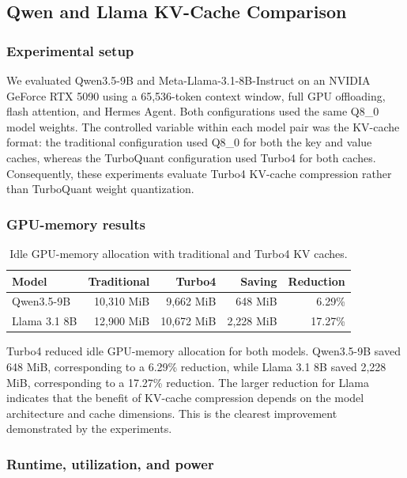 \subsection{Qwen and Llama KV-Cache Comparison}

\subsubsection{Experimental setup}

We evaluated Qwen3.5-9B and Meta-Llama-3.1-8B-Instruct on an
NVIDIA GeForce RTX 5090 using a 65,536-token context window, full GPU
offloading, flash attention, and Hermes Agent. Both configurations used the
same Q8\_0 model weights. The controlled variable within each model pair was
the KV-cache format: the traditional configuration used Q8\_0 for both the
key and value caches, whereas the TurboQuant configuration used Turbo4 for
both caches. Consequently, these experiments evaluate Turbo4 KV-cache
compression rather than TurboQuant weight quantization.

\subsubsection{GPU-memory results}

\begin{table}[t]
\centering
\small
\caption{Idle GPU-memory allocation with traditional and Turbo4 KV caches.}
\label{tab:combined-kv-memory}
\begin{tabular}{lrrrr}
\toprule
Model & Traditional & Turbo4 & Saving & Reduction \\
\midrule
Qwen3.5-9B & 10,310 MiB & 9,662 MiB & 648 MiB & 6.29\% \\
Llama 3.1 8B & 12,900 MiB & 10,672 MiB & 2,228 MiB & 17.27\% \\
\bottomrule
\end{tabular}
\end{table}

Turbo4 reduced idle GPU-memory allocation for both models. Qwen3.5-9B
saved 648 MiB, corresponding to a 6.29\% reduction, while Llama 3.1 8B
saved 2,228 MiB, corresponding to a 17.27\% reduction. The larger reduction
for Llama indicates that the benefit of KV-cache compression depends on the
model architecture and cache dimensions. This is the clearest improvement
demonstrated by the experiments.

\subsubsection{Runtime, utilization, and power}

